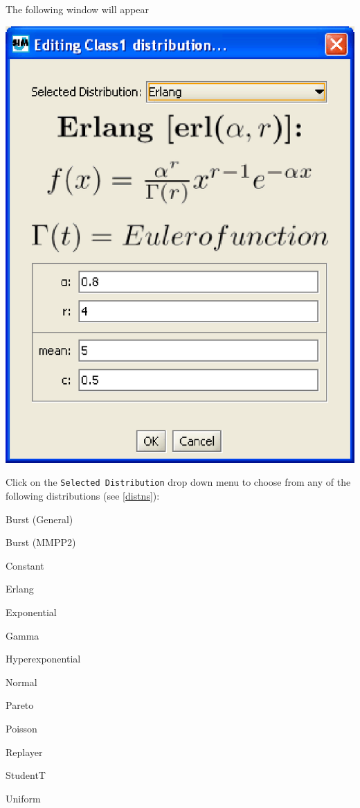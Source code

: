 The following window will appear
\begin{center}
\includegraphics[scale=.5]{img/jsim/erlang.eps}
\end{center}

Click on the \texttt{Selected Distribution} drop down menu to
choose from any of the following distributions (see
\autoref{distns}):
\begin{itemize*}
    \item Burst (General)
    \item Burst (MMPP2)
    \item Constant
    \item Erlang
    \item Exponential
    \item Gamma
    \item Hyperexponential
    \item Normal
    \item Pareto
    \item Poisson
    \item Replayer
    \item StudentT
    \item Uniform
\end{itemize*}

